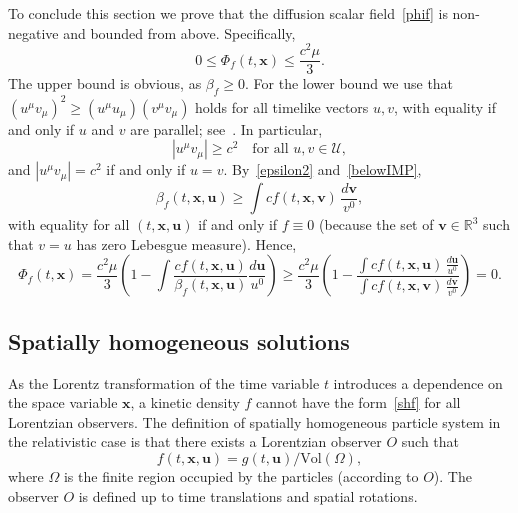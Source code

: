 \documentclass[12pt]{article}
\newcommand{\R}{\mathbb{R}}
\theoremstyle{definition}
\numberwithin{equation}{section}
\begin{document}
To conclude this section we prove that the diffusion scalar field~\eqref{phif} is non-negative and bounded from above. Specifically, 
\[
0\leq \Phi_f(t,{\bm x})\leq \frac{c^2\mu}{3}.
\]
The upper bound is obvious, as $\beta_f\geq0 $. 
For the lower bound we use that $(u^\mu v_\mu)^2\geq (u^\mu u_\mu) (v^\mu v_\mu)$ holds for all timelike vectors $u,v$, with equality if and only if $u$ and $v$ are parallel; see~\cite[Theorem 1.4.1]{N}. In particular, 
\begin{equation}\label{belowIMP}
|u^\mu v_\mu|\geq c^2\quad \text{for all $u,v\in\mathcal{U}$},
\end{equation}
and $|u^\mu v_\mu|=c^2$ if and only if $u=v$.
By~\eqref{epsilon2} and~\eqref{belowIMP}, 
\[
\beta_f(t,{\bm x},{\bm u})\geq \int c f(t,{\bm x},{\bm v})\,\frac{d{\bm v}}{v^0},
\]
with equality for all $(t,{\bm x}, {\bm u})$ if and only if $f\equiv 0$ 
(because the set of ${\bm v}\in\R^3$ such that $v=u$ has zero Lebesgue measure). 
Hence,
\[
\Phi_f(t,{\bm x})=\frac{c^2\mu}{3}\left(1-\int \frac{cf(t,{\bm x},{\bm u})}{\beta_f(t,{\bm x},{\bm u})}\frac{d{\bm u}}{u^0}\right)\geq \frac{c^2\mu}{3}\left(1-\frac{\displaystyle{\int cf(t,{\bm x},{\bm u})\,\frac{d{\bm u}}{u^0}}}{\displaystyle{\int c f(t,{\bm x},{\bm v})\,\frac{d{\bm v}}{v^0}}}\right)=0.
\]




\subsection{Spatially homogeneous solutions}\label{SHsec}
As the Lorentz transformation of the time variable $t$ introduces a dependence on the space variable ${\bm x}$,  a kinetic density $f$ cannot have the form~\eqref{shf} for all Lorentzian observers. The definition of spatially homogeneous particle system in the relativistic case is that there exists a Lorentzian observer $O$ such that  
\[
f(t,{\bm x}, {\bm u})=g(t,{\bm u})/\mathrm{Vol}(\Omega),
\]
where $\Omega$ is the finite region occupied by the particles (according to $O$). The observer $O$ is defined up to time translations and spatial rotations.
\end{document}
